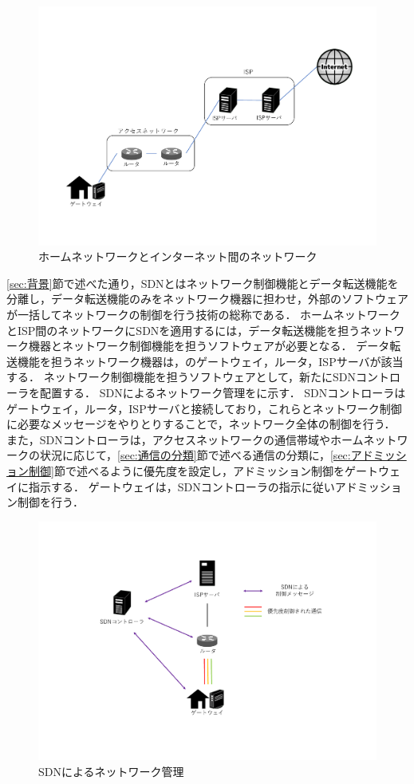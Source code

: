 \documentclass[a4paper,11pt,uplatex]{ujreport}
\begin{document}
  \begin{figure}[tb]
    \centering
    \includegraphics[width=0.85\linewidth]{img/ISP_trimmed.pdf}
    \caption{ホームネットワークとインターネット間のネットワーク}
    \label{fig:ISP}
  \end{figure}

  \ref{sec:背景}節で述べた通り，SDNとはネットワーク制御機能とデータ転送機能を分離し，データ転送機能のみをネットワーク機器に担わせ，外部のソフトウェアが一括してネットワークの制御を行う技術の総称である．
  ホームネットワークとISP間のネットワークにSDNを適用するには，データ転送機能を担うネットワーク機器とネットワーク制御機能を担うソフトウェアが必要となる．
  データ転送機能を担うネットワーク機器は，のゲートウェイ，ルータ，ISPサーバが該当する．
  ネットワーク制御機能を担うソフトウェアとして，新たにSDNコントローラを配置する．
  SDNによるネットワーク管理をに示す．
  SDNコントローラはゲートウェイ，ルータ，ISPサーバと接続しており，これらとネットワーク制御に必要なメッセージをやりとりすることで，ネットワーク全体の制御を行う．
  また，SDNコントローラは，アクセスネットワークの通信帯域やホームネットワークの状況に応じて，\ref{sec:通信の分類}節で述べる通信の分類に，\ref{sec:アドミッション制御}節で述べるように優先度を設定し，アドミッション制御をゲートウェイに指示する．
  ゲートウェイは，SDNコントローラの指示に従いアドミッション制御を行う．\par

  \clearpage

  \begin{figure}[tb]
    \centering
    \includegraphics[width=0.85\linewidth]{img/proposal.pdf}
    \caption{SDNによるネットワーク管理}
    \label{fig:proposal}
  \end{figure}
\end{document}

